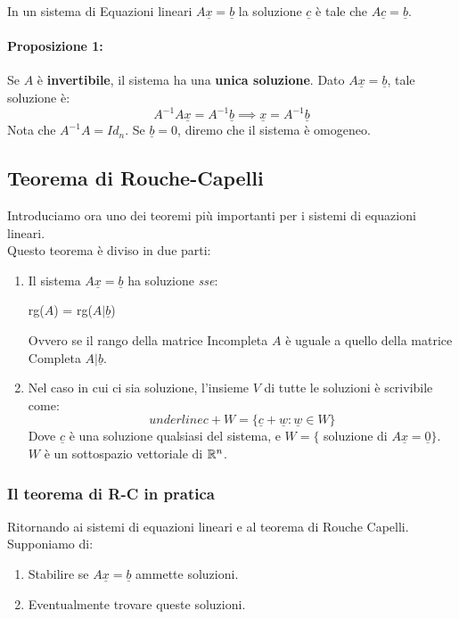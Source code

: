 In un sistema di Equazioni lineari $A\underline{x} = \underline{b}$ la soluzione $\underline{c}$ è tale che $A\underline{c}=\underline{b}$.

\paragraph{Proposizione 1:} Se $A$ è \textbf{invertibile}, il sistema ha una \textbf{unica soluzione}.
Dato $A\underline{x}=\underline{b}$, tale soluzione è:
\[A^{-1} A \underline{x} = A^{-1} \underline{b} \implies \underline{x} = A^{-1}\underline{b}\]
Nota che $A^{-1} A = Id_n$. Se $\underline{b}=0$, diremo che il sistema è omogeneo.

\subsection{Teorema di Rouche-Capelli}
Introduciamo ora uno dei teoremi più importanti per i sistemi di equazioni lineari.
\\Questo teorema è diviso in due parti:

\begin{enumerate}
	\item Il sistema $A\underline{x}=\underline{b}$ ha soluzione \emph{sse}:
	      \begin{center}
		      rg($A$) = rg($A|\underline{b}$)
	      \end{center}
	      Ovvero se il rango della matrice Incompleta $A$ è uguale a quello della matrice Completa $A|\underline{b}$.
	\item Nel caso in cui ci sia soluzione, l'insieme $V$ di tutte le soluzioni è scrivibile come:
	      \[ underline{c} + W = \{ \underline{c} + \underline{w} : \underline{w} \in W\} \]
	      Dove $\underline{c}$ è una soluzione qualsiasi del sistema, e $W= \{$ soluzione di $A\underline{x} = \underline{0} \}$.
	      $W$ è un sottospazio vettoriale di $\mathbb{R}^n$.
\end{enumerate}

\subsubsection{Il teorema di R-C in pratica}
Ritornando ai sistemi di equazioni lineari e al teorema di Rouche Capelli.
Supponiamo di:
\begin{enumerate}
	\item Stabilire se $A\underline{x} =\underline{b}$ ammette soluzioni.
	\item Eventualmente trovare queste soluzioni.
\end{enumerate}

